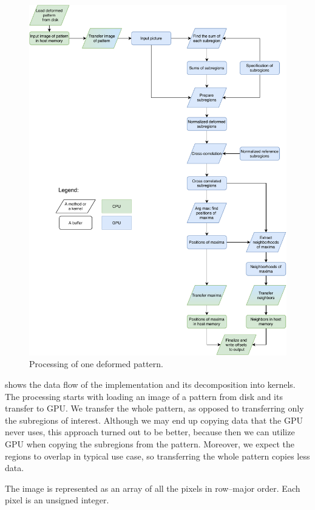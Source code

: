 \begin{figure}
	\centering
	\includegraphics[width=\textwidth]{img/overview}
	\caption{Processing of one deformed pattern.}
	\label{overview}
\end{figure}

 shows the data flow of the implementation and its decomposition into kernels. The processing starts with loading an image of a pattern from disk and its transfer to GPU. We transfer the whole pattern, as opposed to transferring only the subregions of interest.  Although we may end up copying data that the GPU never uses, this approach turned out to be better, because then we can utilize GPU when copying the subregions from the pattern. Moreover, we expect the regions to overlap in typical use case, so transferring the whole pattern copies less data.

The image is represented as an array of all the pixels in row--major order. Each pixel is an unsigned integer. 


